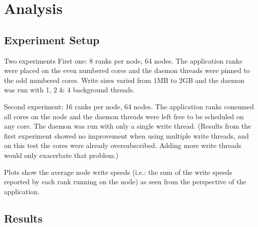 \section{Analysis}
\label{sec:analysis}

\subsection{Experiment Setup}
\label{subsec:exp_setup}

Two experiments
First one: 8 ranks per node, 64 nodes.  The application ranks were placed on the even numbered cores and the daemon threads were pinned to the odd numbered cores. Write sizes varied from 1MB to 2GB and the daemon was run with 1, 2 \& 4 background threads.

Second experiment: 16 ranks per node, 64 nodes.  The application ranks consumed all cores on the node and the daemon threads were left free to be scheduled on any core.  The daemon was run with only a single write thread.  (Results from the first experiment showed no improvement when using multiple write threads, and on this test the cores were already oversubscribed.  Adding more write threads would only exacerbate that problem.)

Plots show the average node write speeds (i.e.: the sum of the write speeds reported by each rank running on the node) as seen from the perspective of the application.


\subsection{Results}
\label{subsec:results}
